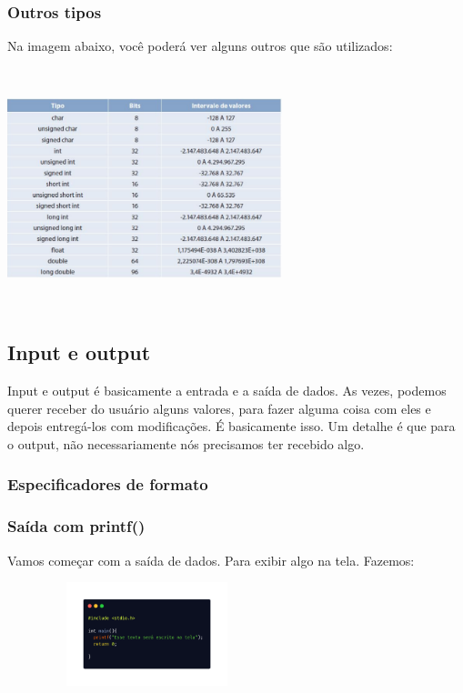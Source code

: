 \documentclass{report}
\begin{document}
	\subsubsection{Outros tipos}
	Na imagem abaixo, você poderá ver alguns outros que são utilizados:
 	\begin{center}
		\includegraphics[width=8cm,height=7cm,keepaspectratio=false]{imagens/tipos.png}
	
	\end{center}
	
	\subsection{Input e output}
	Input e output é basicamente a entrada e a saída de dados. As vezes, podemos querer receber do usuário alguns valores, para fazer alguma coisa com eles e depois entregá-los com modificações. É basicamente isso. Um detalhe é que para o output, não necessariamente nós precisamos ter recebido algo.
	\subsubsection{Especificadores de formato}
	\subsubsection{Saída com printf()}
	Vamos começar com a saída de dados. Para exibir algo na tela. Fazemos:
	\begin{figure}[ht]
		\centering
		\includegraphics[width=6cm,height=3cm,keepaspectratio=false]{imagens/print.png}
		
	\end{figure}
	
\end{document}
